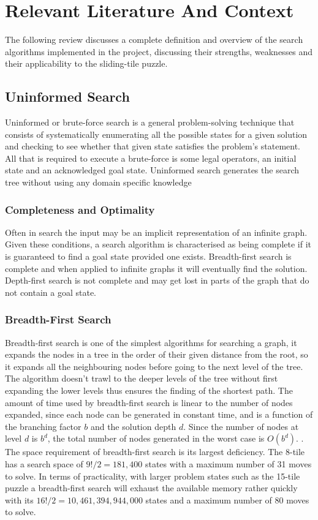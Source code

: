 \documentclass[final]{cmpreport}
\begin{document}
 
 

 


\section{Relevant Literature And Context}
The following review discusses a complete definition and overview of the search algorithms implemented in the project, discussing their strengths, weaknesses and their applicability to the sliding-tile puzzle. 
\subsection{Uninformed Search}
Uninformed or brute-force search is a general problem-solving technique that consists of systematically enumerating all the possible states for a given solution and checking to see whether that given state satisfies the problem's statement. All that is required to execute a brute-force is some legal operators, an initial state and an acknowledged goal state. Uninformed search generates the search tree without using any domain specific knowledge
\subsubsection{Completeness and Optimality}
 Often in search the input may be an implicit representation of an infinite graph. Given these conditions, a search algorithm is characterised as being complete if it is guaranteed to find a goal state provided one exists. Breadth-first search is complete and when applied to infinite graphs it will eventually find the solution. Depth-first search is not complete and may get lost in parts of the graph that do not contain a goal state.
\subsubsection{Breadth-First Search}
Breadth-first search is one of the simplest algorithms for searching a graph, it expands the nodes in a tree in the order of their given distance from the root, so it expands all the neighbouring nodes before going to the next level of the tree. The algorithm doesn't trawl to the deeper levels of the tree without first expanding the lower levels thus ensures the finding of the shortest path. The amount of time used by breadth-first search is linear to the number of nodes expanded, since each node can be generated in constant time, and is a function of the branching factor $b$ and the solution depth $d$. Since the number of nodes at level $d$ is $b^d$, the total number of nodes generated in the worst case is $O(b^d)$. \citep{DBLP:journals/mima/Korf95}. The space requirement of breadth-first search is its largest deficiency. The 8-tile has a search space of $9!/2=181,400$ states with a maximum number of 31 moves to solve. In terms of practicality, with larger problem states such as the 15-tile puzzle a breadth-first search will exhaust the available memory rather quickly with its $16!/2 = 10,461,394,944,000$ states and a maximum number of 80 moves to solve.
\end{document}
